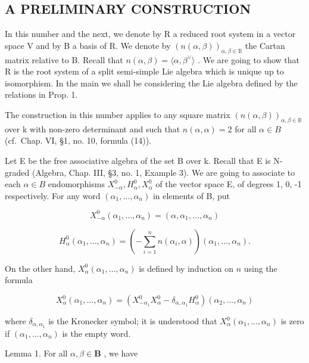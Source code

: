 \subsection{A PRELIMINARY CONSTRUCTION}

In this number and the next, we denote by R a reduced root system in a vector space V and by B a basis of R. We denote by \((n(\alpha,\beta))_{\alpha,\beta\in\mathbb{B}}\) the Cartan matrix relative to B. Recall that \(n(\alpha,\beta)=\langle\alpha,\beta^{\vee}\rangle\) . We are going to show that R is the root system of a split semi-simple Lie algebra which is unique up to isomorphism. In the main we shall be considering the Lie algebra defined by the relations in Prop. 1.

The construction in this number applies to any square matrix \((n(\alpha,\beta))_{\alpha,\beta\in\mathbb{B}}\) over k with non-zero determinant and such that \(n(\alpha,\alpha)=2\) for all \(\alpha\in B\) (cf.~Chap. VI, §1, no. 10, formula (14)).

Let E be the free associative algebra of the set B over k. Recall that E is N-graded (Algebra, Chap. III, §3, no. 1, Example 3). We are going to associate to each \(\alpha\in B\) endomorphisms \(X_{-\alpha}^{0}, H_{\alpha}^{0}, X_{\alpha}^{0}\) of the vector space E, of degrees 1, 0, -1 respectively. For any word \((\alpha_{1},\ldots,\alpha_{n})\) in elements of B, put

\[
X _ {- \alpha} ^ {0} (\alpha_ {1}, \ldots , \alpha_ {n}) = (\alpha , \alpha_ {1}, \ldots , \alpha_ {n})\tag{7}
\]

\[
H _ {\alpha} ^ {0} \left(\alpha_ {1}, \dots , \alpha_ {n}\right) = \left(- \sum_ {i = 1} ^ {n} n \left(\alpha_ {i}, \alpha\right)\right) \left(\alpha_ {1}, \dots , \alpha_ {n}\right).\tag{8}
\]

On the other hand, \(X_{\alpha}^{0}(\alpha_{1},\ldots ,\alpha_{n})\) is defined by induction on \(n\) using the formula

\[
X _ {\alpha} ^ {0} (\alpha_ {1}, \ldots , \alpha_ {n}) = (X _ {- \alpha_ {1}} ^ {0} X _ {\alpha} ^ {0} - \delta_ {\alpha , \alpha_ {1}} H _ {\alpha} ^ {0}) (\alpha_ {2}, \ldots , \alpha_ {n})\tag{9}
\]

where \(\delta_{\alpha, \alpha_1}\) is the Kronecker symbol; it is understood that \(X_{\alpha}^{0}(\alpha_{1}, \ldots, \alpha_{n})\) is zero if \((\alpha_{1}, \ldots, \alpha_{n})\) is the empty word.

Lemma 1. For all \(\alpha, \beta \in \mathbf{B}\) , we have


